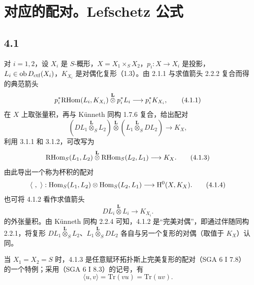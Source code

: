 \section{对应的配对。Lefschetz 公式}

\subsection*{4.1}
对 $i=1,2$，设 $X_i$ 是 $S$-概形，$X=X_1\times_SX_2$，$p_i:X\to X_i$ 是投影，$L_i\in\operatorname{ob}D_{\mathrm{ctf}}(X_i)$，$K_{X_i}$ 是对偶化复形（1.3）。由 2.1.1 与求值箭头 2.2.2 复合而得的典范箭头
\begin{equation}
p_i^*\mathrm{RHom}(L_i,K_{X_i})\overset{\mathbf L}{\otimes}p_i^*L_i
\longrightarrow p_i^*K_{X_i},
\tag{4.1.1}
\end{equation}
在 $X$ 上取张量积，再与 Künneth 同构 1.7.6 复合，给出配对
\begin{equation}
(DL_1\overset{\mathbf L}{\otimes}_S L_2)\overset{\mathbf L}{\otimes}(L_1\overset{\mathbf L}{\otimes}_S DL_2)
\longrightarrow K_X,
\tag{4.1.2}
\end{equation}
利用 3.1.1 和 3.1.2，可改写为
\begin{equation}
\mathrm{RHom}_S(L_1,L_2)\overset{\mathbf L}{\otimes}\mathrm{RHom}_S(L_2,L_1)
\longrightarrow K_X.
\tag{4.1.3}
\end{equation}
由此导出一个称为杯积的配对
\begin{equation}
\langle\ ,\ \rangle:\Hom_S(L_1,L_2)\otimes\Hom_S(L_2,L_1)
\longrightarrow \H^0(X,K_X).
\tag{4.1.4}
\end{equation}
也可将 4.1.2 看作求值箭头
\[
DL_i\overset{\mathbf L}{\otimes}L_i\longrightarrow K_{X_i}.
\]
的外张量积。由 Künneth 同构 2.2.4 可知，4.1.2 是“完美对偶”，即通过伴随同构 2.2.1，将复形 $DL_1\overset{\mathbf L}{\otimes}_S L_2$、$L_1\overset{\mathbf L}{\otimes}_S DL_2$ 各自与另一个复形的对偶（取值于 $K_X$）认同。

当 $X_1=X_2=S$ 时，4.1.3 是任意赋环拓扑斯上完美复形的配对（SGA 6 I 7.8）的一个特例；采用（SGA 6 I 8.3）的记号，有
\begin{equation}
\langle u,v\rangle=\mathrm{Tr}(vu)=\mathrm{Tr}(uv).
\tag{4.1.5}
\end{equation}


